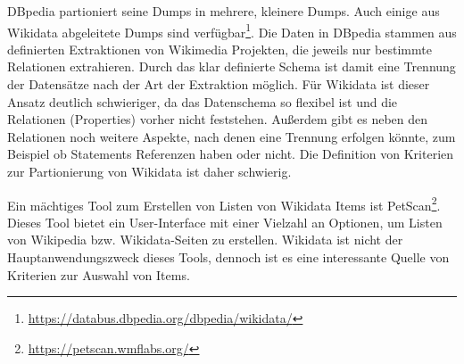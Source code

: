 DBpedia\cite{dbpedia} partioniert seine Dumps in mehrere, kleinere Dumps.
Auch einige aus Wikidata abgeleitete Dumps sind verfügbar\footnote{\url{https://databus.dbpedia.org/dbpedia/wikidata/}}.
Die Daten in DBpedia stammen aus definierten Extraktionen von Wikimedia Projekten, die jeweils nur bestimmte Relationen extrahieren.
Durch das klar definierte Schema ist damit eine Trennung der Datensätze nach der Art der Extraktion möglich.
Für Wikidata ist dieser Ansatz deutlich schwieriger, da das Datenschema so flexibel ist und die Relationen (Properties) vorher nicht feststehen.
Außerdem gibt es neben den Relationen noch weitere Aspekte, nach denen eine Trennung erfolgen könnte, zum Beispiel ob Statements Referenzen haben oder nicht.
Die Definition von Kriterien zur Partionierung von Wikidata ist daher schwierig.

Ein mächtiges Tool zum Erstellen von Listen von Wikidata Items ist PetScan\footnote{\url{https://petscan.wmflabs.org/}}.
Dieses Tool bietet ein User-Interface mit einer Vielzahl an Optionen, um Listen von Wikipedia bzw. Wikidata-Seiten zu erstellen.
Wikidata ist nicht der Hauptanwendungszweck dieses Tools, dennoch ist es eine interessante Quelle von Kriterien zur Auswahl von Items.